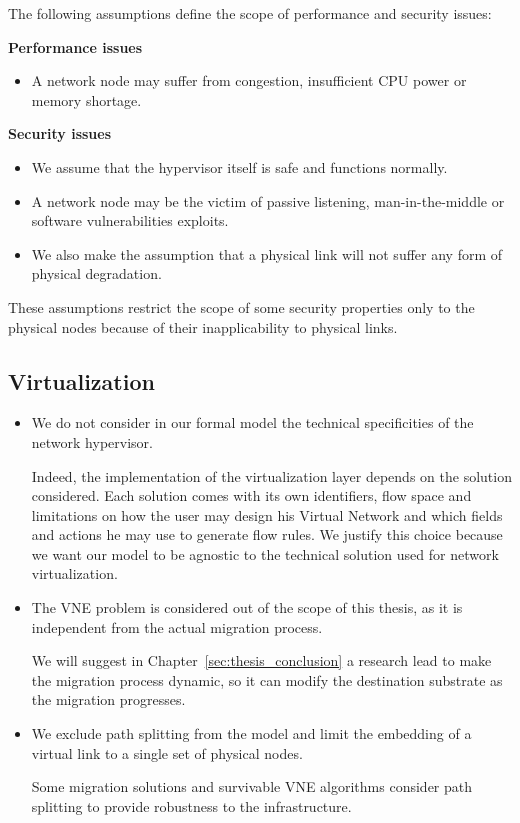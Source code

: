 \newpage
The following assumptions define the scope of performance and security issues:

\textbf{Performance issues} 
\begin{itemize}
    \item A network node may suffer from congestion, insufficient CPU power or memory shortage. 
\end{itemize} 

\textbf{Security issues} 
\begin{itemize}
    \item We assume that the hypervisor itself is safe and functions normally.
    \item A network node may be the victim of passive listening, man-in-the-middle or software vulnerabilities exploits.
    \item We also make the assumption that a physical link will not suffer any form of physical degradation.
\end{itemize}

These assumptions  restrict the scope of some security properties only to the physical nodes because of their inapplicability to physical links.



\subsection{Virtualization}

\begin{itemize}
    \item We do not consider in our formal model the technical specificities of the network hypervisor.
    
    Indeed, the implementation of the virtualization layer depends on the solution considered.
    Each solution comes with its own identifiers, flow space and limitations on how the user may design his Virtual Network and which fields and actions he may use to generate flow rules. 
    We justify this choice because we want our model to be agnostic to the technical solution used for network virtualization.
    
    \item The VNE problem is considered out of the scope of this thesis, as it is independent from the actual migration process. 
    
    We will suggest in Chapter~\ref{sec:thesis_conclusion} a research lead to make the migration process dynamic, so it can modify the destination substrate as the migration progresses. 
    
    \item We exclude path splitting from the model and limit the embedding of a virtual link to a single set of physical nodes.
    
    Some migration solutions and survivable VNE algorithms consider path splitting to provide robustness to the infrastructure.


    
\end{itemize}






